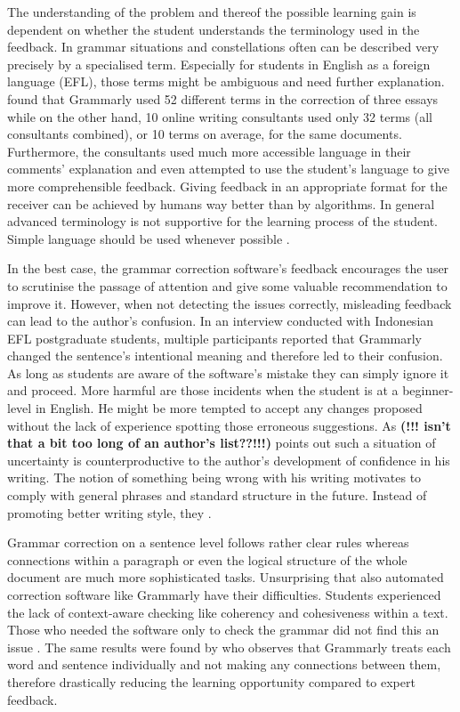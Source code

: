 \documentclass[runningheads]{llncs}
\begin{document}
The understanding of the problem and thereof the possible learning gain is dependent on whether the student understands the terminology used in the feedback. In grammar situations and constellations often can be described very precisely by a specialised term. Especially for students in English as a foreign language (EFL), those terms might be ambiguous and need further explanation. \textcite{dembsey_closing_2017} found that Grammarly used 52 different terms in the correction of three essays while on the other hand, 10 online writing consultants used only 32 terms (all consultants combined), or 10 terms on average, for the same documents. Furthermore, the consultants used much more accessible language in their comments' explanation and even attempted to use the student's language to give more comprehensible feedback. Giving feedback in an appropriate format for the receiver can be achieved by humans way better than by algorithms. In general advanced terminology is not supportive for the learning process of the student. Simple language should be used whenever possible \citep{dembsey_closing_2017}.

In the best case, the grammar correction software's feedback encourages the user to scrutinise the passage of attention and give some valuable recommendation to improve it. However, when not detecting the issues correctly, misleading feedback can lead to the author's confusion. In an interview conducted with Indonesian EFL postgraduate students, \citep{nova_utilizing_2018} multiple participants reported that Grammarly changed the sentence's intentional meaning and therefore led to their confusion. As long as students are aware of the software's mistake they can simply ignore it and proceed. More harmful are those incidents when the student is at a beginner-level in English. He might be more tempted to accept any changes proposed without the lack of experience spotting those erroneous suggestions. As \textcite{vojak_new_2011} \textbf{(!!! isn't that a bit too long of an author's list??!!!)} points out such a situation of uncertainty is counterproductive to the author's development of confidence in his writing. The notion of something being wrong with his writing motivates to comply with general phrases and standard structure in the future. Instead of promoting better writing style, they . 

Grammar correction on a sentence level follows rather clear rules whereas connections within a paragraph or even the logical structure of the whole document are much more sophisticated tasks. Unsurprising that also automated correction software like Grammarly have their difficulties. Students experienced the lack of context-aware checking like coherency and cohesiveness within a text. Those who needed the software only to check the grammar did not find this an issue \citep{nova_utilizing_2018}. The same results were found by \textcite{dembsey_closing_2017} who observes that Grammarly treats each word and sentence individually and not making any connections between them, therefore drastically reducing the learning opportunity compared to expert feedback.
\end{document}
